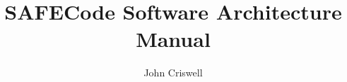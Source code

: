 \documentclass{article}
\begin{document}
\title{\Large \bf SAFECode Software Architecture Manual}

\author{John Criswell}

\maketitle
{}

%
%
%






%
%
\end{document}
